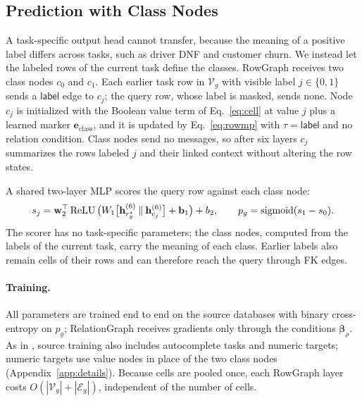 \subsection{Prediction with Class Nodes}
\label{sec:method:prediction}

A task-specific output head cannot transfer, because the meaning of a
positive label differs across tasks, such as driver DNF and customer churn.
We instead let the labeled rows of the current task define the classes.
RowGraph receives two class nodes $c_0$ and $c_1$. Each earlier task row in
$\mathcal V_g$ with visible label $j\in\{0,1\}$ sends a $\mathsf{label}$ edge
to $c_j$; the query row, whose label is masked, sends none. Node $c_j$ is
initialized with the Boolean value term of Eq.~\eqref{eq:cell} at value $j$
plus a learned marker $\mathbf e_{\mathrm{class}}$, and it is updated by
Eq.~\eqref{eq:rowmp} with $\tau=\mathsf{label}$ and no relation condition.
Class nodes send no messages, so after six layers $c_j$ summarizes the rows
labeled $j$ and their linked context without altering the row states.

A shared two-layer MLP scores the query row against each class node:
\begin{equation}
 s_j=\mathbf w_2^{\top}\operatorname{ReLU}\big(
 W_1\big[\mathbf h_{r_g^\star}^{(6)}\mathbin\Vert\mathbf h_{c_j}^{(6)}\big]
 +\mathbf b_1\big)+b_2,
 \qquad
 p_g=\operatorname{sigmoid}(s_1-s_0).
 \label{eq:readout}
\end{equation}
The scorer has no task-specific parameters; the class nodes, computed from
the labels of the current task, carry the meaning of each class. Earlier
labels also remain cells of their rows and can therefore reach the query
through FK edges.

\paragraph{Training.}
All parameters are trained end to end on the source databases with binary
cross-entropy on $p_g$; RelationGraph receives gradients only through the
conditions $\boldsymbol\beta_\rho$. As in \RT{}, source training also
includes autocomplete tasks and numeric targets; numeric targets use value
nodes in place of the two class nodes (Appendix~\ref{app:details}). Because
cells are pooled once, each RowGraph layer costs
$O(|\mathcal V_g|+|\mathcal E_g|)$, independent of the number of cells.
